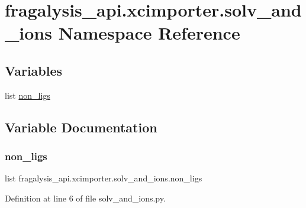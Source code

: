 \hypertarget{namespacefragalysis__api_1_1xcimporter_1_1solv__and__ions}{}\section{fragalysis\+\_\+api.\+xcimporter.\+solv\+\_\+and\+\_\+ions Namespace Reference}
\label{namespacefragalysis__api_1_1xcimporter_1_1solv__and__ions}
\subsection*{Variables}
\begin{DoxyCompactItemize}
\item 
list \hyperlink{namespacefragalysis__api_1_1xcimporter_1_1solv__and__ions_ab2238b69ac675d57a675a934190ac5e5}{non\+\_\+ligs}
\end{DoxyCompactItemize}


\subsection{Variable Documentation}
\mbox{\label{namespacefragalysis__api_1_1xcimporter_1_1solv__and__ions_ab2238b69ac675d57a675a934190ac5e5}} 
\subsubsection{\texorpdfstring{non\+\_\+ligs}{non\_ligs}}
{\footnotesize\ttfamily list fragalysis\+\_\+api.\+xcimporter.\+solv\+\_\+and\+\_\+ions.\+non\+\_\+ligs}



Definition at line 6 of file solv\+\_\+and\+\_\+ions.\+py.


